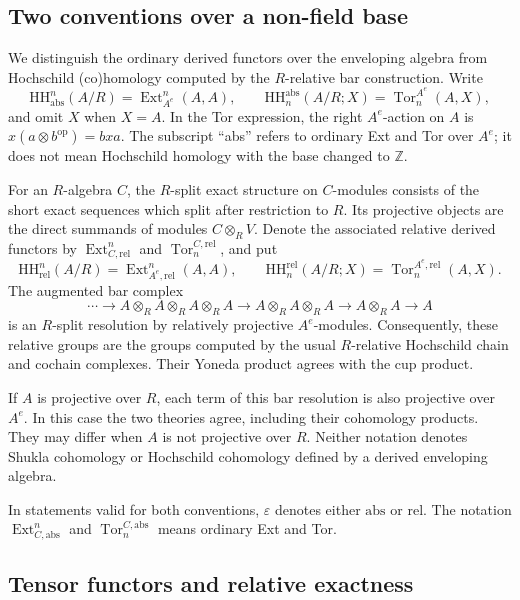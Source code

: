 \documentclass[12pt,a4paper,english,reqno]{amsart}
\numberwithin{equation}{section}
\theoremstyle{plain}
\theoremstyle{definition}
\begin{document}
\subsection{Two conventions over a non-field base}

We distinguish the ordinary derived functors over the enveloping
algebra from Hochschild (co)homology computed by the $R$-relative bar
construction.  Write
\[
 \mathrm{HH}^{n}_{\mathrm{abs}}(A/R)
   =\operatorname{Ext}_{A^e}^{n}(A,A),
 \qquad
 \mathrm{HH}^{\mathrm{abs}}_{n}(A/R;X)
   =\operatorname{Tor}^{A^e}_{n}(A,X),
\]
and omit $X$ when $X=A$.  In the Tor expression, the right $A^e$-action
on $A$ is $x(a\otimes b^{\mathrm{op}})=bxa$.
The subscript ``abs'' refers to ordinary Ext and Tor over $A^e$; it does
not mean Hochschild homology with the base changed to $\mathbb Z$.

For an $R$-algebra $C$, the $R$-split exact structure on
$C$-modules consists of the short exact sequences which split after
restriction to $R$.  Its projective objects are the direct summands of
modules $C\otimes_R V$.  Denote the associated relative derived functors
by $\operatorname{Ext}_{C,\mathrm{rel}}^n$ and
$\operatorname{Tor}^{C,\mathrm{rel}}_n$, and put
\[
 \mathrm{HH}^{n}_{\mathrm{rel}}(A/R)
   =\operatorname{Ext}_{A^e,\mathrm{rel}}^{n}(A,A),
 \qquad
 \mathrm{HH}^{\mathrm{rel}}_{n}(A/R;X)
   =\operatorname{Tor}^{A^e,\mathrm{rel}}_{n}(A,X).
\]
The augmented bar complex
\[
 \cdots\longrightarrow A\otimes_R A\otimes_R A\otimes_R A
 \longrightarrow A\otimes_R A\otimes_R A
 \longrightarrow A\otimes_R A\longrightarrow A
\]
is an $R$-split resolution by relatively projective $A^e$-modules.
Consequently, these relative groups are the groups computed
by the usual $R$-relative Hochschild chain and cochain complexes.
Their Yoneda product agrees with the cup product.

If $A$ is projective over $R$, each term of this bar resolution is also
projective over $A^e$.  In this case the two theories agree, including
their cohomology products.  They may differ when $A$ is not projective
over $R$.  Neither notation denotes Shukla cohomology or Hochschild
cohomology defined by a derived enveloping algebra.

In statements valid for both conventions, $\varepsilon$ denotes either
$\mathrm{abs}$ or $\mathrm{rel}$.  The notation
$\operatorname{Ext}_{C,\mathrm{abs}}^n$ and
$\operatorname{Tor}^{C,\mathrm{abs}}_n$ means ordinary Ext and Tor.

\subsection{Tensor functors and relative exactness}
\end{document}
